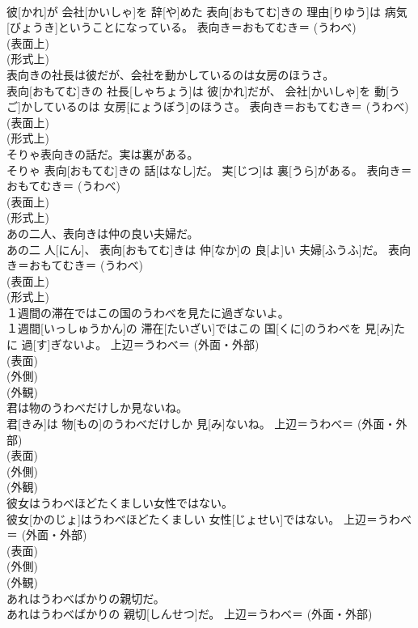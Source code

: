 \documentclass[8pt]{extreport}
\begin{document}
\begin{CJK}{UTF8}{min}
{\\	彼[かれ]が 会社[かいしゃ]を 辞[や]めた 表向[おもてむ]きの 理由[りゆう]は 病気[びょうき]ということになっている。	表向き＝おもてむき＝ (うわべ) 
\\	(表面上) 
\\	(形式上) 
\\	表向きの社長は彼だが、会社を動かしているのは女房のほうさ。	
\\	表向[おもてむ]きの 社長[しゃちょう]は 彼[かれ]だが、 会社[かいしゃ]を 動[うご]かしているのは 女房[にょうぼう]のほうさ。	表向き＝おもてむき＝ (うわべ) 
\\	(表面上) 
\\	(形式上) 
\\	そりゃ表向きの話だ。実は裏がある。	
\\	そりゃ 表向[おもてむ]きの 話[はなし]だ。 実[じつ]は 裏[うら]がある。	表向き＝おもてむき＝ (うわべ) 
\\	(表面上) 
\\	(形式上) 
\\	あの二人、表向きは仲の良い夫婦だ。	
\\	あの二 人[にん]、 表向[おもてむ]きは 仲[なか]の 良[よ]い 夫婦[ふうふ]だ。	表向き＝おもてむき＝ (うわべ) 
\\	(表面上) 
\\	(形式上) 
\\	１週間の滞在ではこの国のうわべを見たに過ぎないよ。	
\\	１週間[いっしゅうかん]の 滞在[たいざい]ではこの 国[くに]のうわべを 見[み]たに 過[す]ぎないよ。	上辺＝うわべ＝ (外面・外部) 
\\	(表面) 
\\	(外側) 
\\	(外観) 
\\	君は物のうわべだけしか見ないね。	
\\	君[きみ]は 物[もの]のうわべだけしか 見[み]ないね。	上辺＝うわべ＝ (外面・外部) 
\\	(表面) 
\\	(外側) 
\\	(外観) 
\\	彼女はうわべほどたくましい女性ではない。	
\\	彼女[かのじょ]はうわべほどたくましい 女性[じょせい]ではない。	上辺＝うわべ＝ (外面・外部) 
\\	(表面) 
\\	(外側) 
\\	(外観) 
\\	あれはうわべばかりの親切だ。	
\\	あれはうわべばかりの 親切[しんせつ]だ。	上辺＝うわべ＝ (外面・外部) 
}
\end{CJK}
\end{document}
